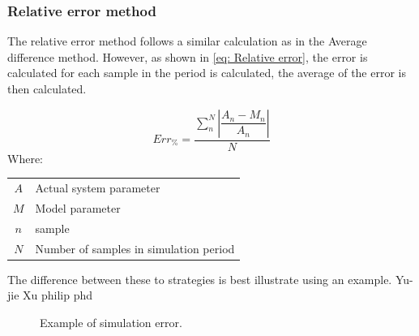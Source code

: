  		\subsubsection{Relative error method}
 		The relative error method follows a similar calculation as in the Average difference method. However, as shown in \cref{eq: Relative error}, the error is calculated for each sample in the period is calculated, the average of the error is then calculated.
 			
 			\begin{equation}
 			\label{eq: Relative error}
 			Err_{\%} = \dfrac{\sum_{n}^{N}{\left|\dfrac{A_{n} - M_{n}}{A_{n}}\right| }}{N}
 			\end{equation}
 			Where: 
 			\begin{table}[h!]
 				\centering
 				\begin{tabular}{cl}
 					$A$ & Actual system parameter \\
 					$M$ & Model parameter \\
 					$n$ & sample \\
 					$N$ & Number of samples in simulation period \\
 				\end{tabular} 
 			\end{table}	
 		The difference between these to strategies is best illustrate using an example.
 		Yu-jie Xu \cite{xu2016modeling}
 		philip phd \cite{Mare2016PhD}
 		
 	\begin{figure}[h!]
 		\centering
 		\caption{Example of simulation error.\cite{Mare2016PhD}}
 		\label{fig:Philipp Diffeence verify}
 	\end{figure}
